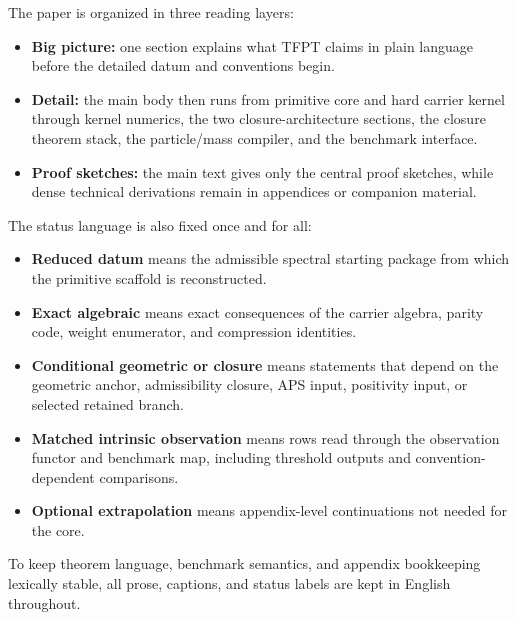 The paper is organized in three reading layers:
\begin{itemize}[leftmargin=1.5em, topsep=3pt, itemsep=2pt]
    \item \textbf{Big picture:} one section explains what TFPT claims in plain language before the detailed datum and conventions begin.
    \item \textbf{Detail:} the main body then runs from primitive core and hard carrier kernel through kernel numerics, the two closure-architecture sections, the closure theorem stack, the particle/mass compiler, and the benchmark interface.
    \item \textbf{Proof sketches:} the main text gives only the central proof sketches, while dense technical derivations remain in appendices or companion material.
\end{itemize}
The status language is also fixed once and for all:
\begin{itemize}[leftmargin=1.5em, topsep=3pt, itemsep=2pt]
    \item \textbf{Reduced datum} means the admissible spectral starting package from which the primitive scaffold is reconstructed.
    \item \textbf{Exact algebraic} means exact consequences of the carrier algebra, parity code, weight enumerator, and compression identities.
    \item \textbf{Conditional geometric or closure} means statements that depend on the geometric anchor, admissibility closure, APS input, positivity input, or selected retained branch.
    \item \textbf{Matched intrinsic observation} means rows read through the observation functor and benchmark map, including threshold outputs and convention-dependent comparisons.
    \item \textbf{Optional extrapolation} means appendix-level continuations not needed for the core.
\end{itemize}
To keep theorem language, benchmark semantics, and appendix bookkeeping lexically stable, all prose, captions, and status labels are kept in English throughout.

